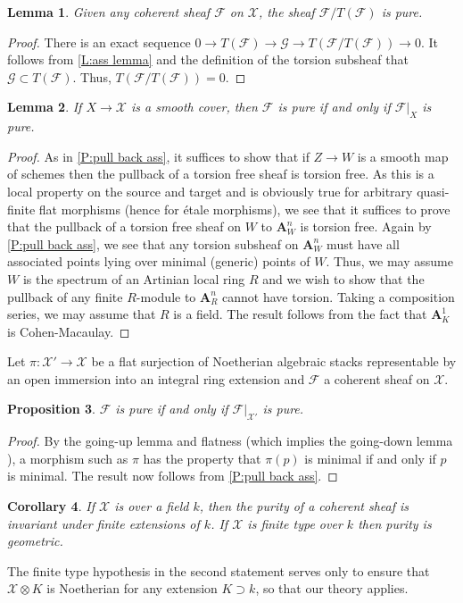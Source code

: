 \documentclass[11pt]{amsart}
\newcommand{\field}[1]{\mathbf #1}
\newcommand{\ms}[1]{\mathscr #1}
\newcommand{\A}{\field A}
\renewcommand{\[}{[\!\hspace{0.03em}[}
\renewcommand{\]}{]\!\hspace{0.03em}]}
\renewcommand{\(}{(\!\hspace{0.03em}(}
\renewcommand{\)}{)\!\hspace{0.03em})}
\DeclareMathOperator*{\tensor}{\otimes}
\newtheorem{lem}{Lemma}[subsubsection]%
\newtheorem{prop}[lem]{Proposition}
\newtheorem{cor}[lem]{Corollary}
\theoremstyle{definition}
\theoremstyle{remark}
\begin{document}
\begin{lem}\label{L:purification no torsion} Given any coherent sheaf $\ms F$ on $\ms X$, the sheaf 
$\ms F/T(\ms F)$ is pure.
\end{lem}
\begin{proof} There is an exact sequence $0\to T(\ms F)\to\ms G\to 
T(\ms F/T(\ms F))\to 0$.  It follows from \ref{L:ass lemma} and the 
definition of the torsion subsheaf that $\ms 
G\subset T(\ms F)$.  Thus, $T(\ms F/T(\ms F))=0$.
\end{proof}

\begin{lem}\label{L:pure smooth ass} If $X\to\ms X$ is a smooth cover, then $\ms F$ is pure if 
and only if $\ms F|_{X}$ is pure.
\end{lem}
\begin{proof} As in \ref{P:pull back ass}, it suffices to show that 
if $Z\to W$ is a smooth map of schemes then the pullback of a torsion 
free sheaf is torsion free.  As this is a local property on the source 
and target and is obviously true for arbitrary 
quasi-finite flat morphisms (hence for \'etale morphisms), we see that 
it suffices to prove that the pullback of a torsion free sheaf on $W$ 
to $\A^{n}_{W}$ is torsion free.  Again by \ref{P:pull back ass}, we 
see that any torsion subsheaf on $\A^{n}_{W}$ must have all 
associated points lying over minimal (generic) points of $W$.  Thus, 
we may assume $W$ is the spectrum of an Artinian local ring $R$ and we 
wish to show that the pullback of any finite $R$-module to $\A^{n}_{R}$ 
cannot have torsion.  Taking a composition series, we may assume 
that $R$ is a field.  The result follows from the fact that 
$\A^{1}_{K}$ is Cohen-Macaulay.
\end{proof}


Let $\pi:\ms X'\to\ms X$ be a flat surjection 
of Noetherian algebraic stacks representable by an open immersion into 
an integral ring extension and $\ms F$ a coherent sheaf on $\ms X$.
\begin{prop} $\ms F$ is pure if and only if $\ms F|_{\ms X'}$ is pure.
\end{prop}
\begin{proof} By the going-up lemma \cite[9.4]{matsumura} and 
flatness (which implies the going-down lemma \cite[9.5]{matsumura}), 
a morphism such as $\pi$ has the property that $\pi(p)$ is minimal if 
and only if $p$ is minimal.  The result now follows from \ref{P:pull back ass}.
\end{proof}
\begin{cor} If $\ms X$ is over a field $k$, then the 
purity of a coherent sheaf is invariant under finite extensions of 
$k$.  If $\ms X$ is finite type over $k$ then purity is geometric.
\end{cor}
The finite type hypothesis in the second statement serves only to 
ensure that $\ms X\tensor K$ is Noetherian for any extension $K\supset 
k$, so that our theory applies.
\end{document}
